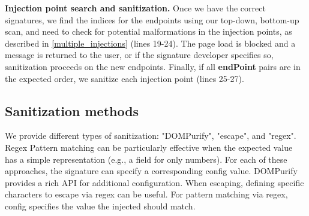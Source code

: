 \textbf{Injection point search and sanitization.}
Once we have the correct signatures, we find the indices for the endpoints using our top-down, bottom-up scan, and need to check for potential malformations in the injection points, as described in \autoref{multiple_injections} (lines 19-24). The page load is blocked and a message is returned to the user, or if the signature developer specifies so, sanitization proceeds on the new endpoints. Finally, if all \textbf{endPoint} pairs are in the expected order, we sanitize each injection point (lines 25-27).

\subsection{Sanitization methods} \label{sanitization_methods}
We provide different types of sanitization: "DOMPurify", "escape", and "regex". Regex Pattern matching can be particularly effective when the expected value has a simple representation (e.g., a field for only numbers). For each of these approaches, the signature can specify a corresponding config value. DOMPurify provides a rich API for additional configuration. When escaping, defining specific characters to escape via regex can be useful. For pattern matching via regex, config specifies the value the injected should match.
